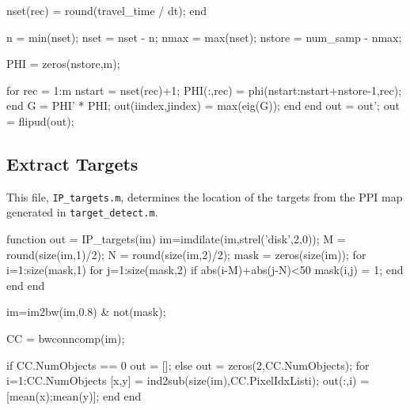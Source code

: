 \documentclass[12pt,openany,a4paper]{book}
\begin{document}
\begin{spverbatim}
            nset(rec) = round(travel_time / dt);
        end
        
        n = min(nset);
        nset = nset - n;
        nmax = max(nset);
        nstore = num_samp - nmax;
        
        PHI = zeros(nstore,m);   
         
        for rec = 1:m
            nstart = nset(rec)+1;
            PHI(:,rec) = phi(nstart:nstart+nstore-1,rec);
        end
        G = PHI' * PHI;
        out(iindex,jindex) = max(eig(G));
    end
end            
out = out';
out = flipud(out);
\end{spverbatim}

\subsection{Extract Targets}
\label{IP}
This file, \verb+IP_targets.m+, determines the location of the targets from the PPI map generated in \verb+target_detect.m+.

\begin{spverbatim}
function out = IP_targets(im)
im=imdilate(im,strel('disk',2,0));
M = round(size(im,1)/2);
N = round(size(im,2)/2);
mask = zeros(size(im));
for i=1:size(mask,1)
    for j=1:size(mask,2)
        if abs(i-M)+abs(j-N)<50
            mask(i,j) = 1;
        end
    end
end

im=im2bw(im,0.8) & not(mask);

CC = bwconncomp(im);

if CC.NumObjects == 0
    out = [];
else
    out = zeros(2,CC.NumObjects);
    for i=1:CC.NumObjects
        [x,y] = ind2sub(size(im),CC.PixelIdxList{i});
        out(:,i) = [mean(x);mean(y)];
    end
end
\end{spverbatim}
\end{document}
